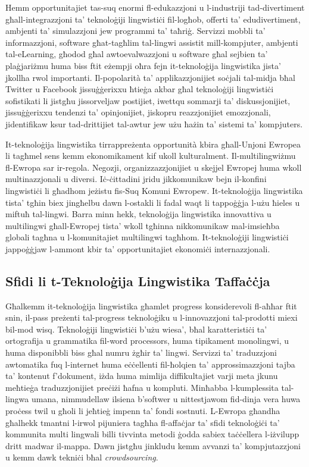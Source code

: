 \documentclass[]{../../metanetpaper}
\begin{document}
\begin{multicols}{2}
Hemm opportunitajiet tas-suq enormi fl-edukazzjoni u l-industriji tad-divertiment għall-integrazzjoni ta’ teknoloġiji lingwistiċi fil-logħob, offerti ta’ edudivertiment, ambjenti ta’ simulazzjoni jew programmi ta’ taħriġ. Servizzi mobbli ta’ informazzjoni, software  għat-tagħlim tal-lingwi assistit mill-kompjuter, ambjenti tal-eLearning, għodod għal awtoevalwazzjoni u software għal sejbien ta’ plaġjariżmu huma biss ftit eżempji oħra fejn it-teknoloġija lingwistika jista’ jkollha rwol importanti. Il-popolarità ta’ applikazzjonijiet soċjali tal-midja bħal Twitter u Facebook jissuġġerixxu ħtieġa akbar għal teknoloġiji lingwistiċi sofistikati li jistgħu jissorveljaw postijiet, iwettqu sommarji ta’ diskussjonijiet, jissuġġerixxu tendenzi ta’ opinjonijiet, jiskopru reazzjonijiet emozzjonali, jidentifikaw ksur tad-drittijiet tal-awtur jew użu ħażin ta’ sistemi ta’ kompjuters.

It-teknoloġija lingwistika tirrappreżenta opportunità kbira għall-Unjoni Ewropea li tagħmel sens kemm ekonomikament kif ukoll kulturalment. Il-multilingwiżmu fl-Ewropa sar ir-regola. Negozji, organizzazzjonijiet u skejjel Ewropej huma wkoll multinazzjonali u diversi. Iċ-ċittadini jridu jikkomunikaw bejn il-konfini lingwistiċi li għadhom jeżistu fis-Suq Komuni Ewropew. It-teknoloġija lingwistika tista’ tgħin biex jingħelbu dawn l-ostakli li fadal waqt li tappoġġja l-użu ħieles u miftuħ tal-lingwi. Barra minn hekk, teknoloġija lingwistika innovattiva u multilingwi   għall-Ewropej tista’ wkoll tgħinna nikkomunikaw mal-imsieħba globali tagħna u l-komunitajiet multilingwi tagħhom. It-teknoloġiji lingwistiċi jappoġġjaw l-ammont kbir ta’ opportunitajiet ekonomiċi internazzjonali.

\subsection{Sfidi li t-Teknoloġija Lingwistika Taffaċċja}

Għalkemm it-teknoloġija lingwistika għamlet progress konsiderevoli fl-aħħar ftit snin, il-pass preżenti tal-progress teknoloġiku u l-innovazzjoni tal-prodotti miexi bil-mod wisq. Teknoloġiji lingwistiċi b’użu wiesa’, bħal karatteristiċi ta’ ortografija u grammatika fil-word processors, huma tipikament monolingwi, u huma disponibbli biss għal numru żgħir ta’ lingwi. Servizzi ta' traduzzjoni awtomatika fuq l-internet huma eċċellenti fil-ħolqien ta’ approssimazzjoni tajba ta’ kontenut f’dokument, iżda huma mimlija diffikultajiet varji meta jkunu meħtieġa traduzzjonijiet preċiżi ħafna u kompluti. Minħabba l-kumplessita tal-lingwa umana, nimmudellaw ilsiena b’softwer u nittestjawom fid-dinja vera huwa proċess twil u għoli li jeħtieġ impenn ta’ fondi sostnuti. L-Ewropa għandha għalhekk tmantni l-irwol pijuniera tagħha fl-affaċjar ta’ sfidi teknoloġiċi ta’ kommunita multi lingwali billi tivvinta metodi ġodda sabiex taċċellera l-iżvilupp dritt madwar il-mappa. Dawn jistgħu jinkludu kemm avvanzi ta’ kompjutazzjoni u kemm dawk tekniċi bħal \emph{crowdsourcing}.


\end{multicols}
\end{document}
